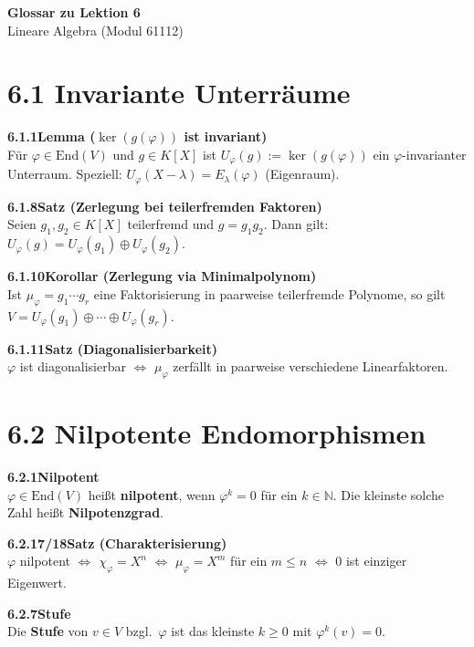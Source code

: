 \documentclass[a4paper,12pt]{article}
\newcommand{\gentry}[3]{%
  \noindent\textbf{#1\quad #2}\nopagebreak\\[0.2em]
  #3\par\smallskip
}
\begin{document}
\begin{center}
  {\LARGE\bfseries Glossar zu Lektion 6}\\[0.5em]
  {\large Lineare Algebra (Modul 61112)}
\end{center}

\vspace{0.8em}

\section*{6.1 \quad Invariante Unterräume}

\gentry{6.1.1}{Lemma ($\ker(g(\varphi))$ ist invariant)}{%
  Für $\varphi \in \mathrm{End}(V)$ und $g \in K[X]$ ist $U_\varphi(g) := \ker(g(\varphi))$ ein $\varphi$-invarianter Unterraum.
  Speziell: $U_\varphi(X-\lambda) = E_\lambda(\varphi)$ (Eigenraum).
}

\gentry{6.1.8}{Satz (Zerlegung bei teilerfremden Faktoren)}{%
  Seien $g_1, g_2 \in K[X]$ teilerfremd und $g = g_1 g_2$. Dann gilt:
  $U_\varphi(g) = U_\varphi(g_1) \oplus U_\varphi(g_2)$.
}

\gentry{6.1.10}{Korollar (Zerlegung via Minimalpolynom)}{%
  Ist $\mu_\varphi = g_1 \cdots g_r$ eine Faktorisierung in paarweise teilerfremde Polynome, so gilt $V = U_\varphi(g_1) \oplus \cdots \oplus U_\varphi(g_r)$.
}

\gentry{6.1.11}{Satz (Diagonalisierbarkeit)}{%
  $\varphi$ ist diagonalisierbar $\iff$ $\mu_\varphi$ zerfällt in paarweise verschiedene Linearfaktoren.
}

\section*{6.2 \quad Nilpotente Endomorphismen}

\gentry{6.2.1}{Nilpotent}{%
  $\varphi \in \mathrm{End}(V)$ heißt \textbf{nilpotent}, wenn $\varphi^k = 0$ für ein $k \in \mathbb{N}$.
  Die kleinste solche Zahl heißt \textbf{Nilpotenzgrad}.
}

\gentry{6.2.17/18}{Satz (Charakterisierung)}{%
  $\varphi$ nilpotent $\iff$ $\chi_\varphi = X^n$ $\iff$ $\mu_\varphi = X^m$ für ein $m \leq n$ $\iff$ $0$ ist einziger Eigenwert.
}

\gentry{6.2.7}{Stufe}{%
  Die \textbf{Stufe} von $v \in V$ bzgl.\ $\varphi$ ist das kleinste $k \geq 0$ mit $\varphi^k(v) = 0$.
}
\end{document}
